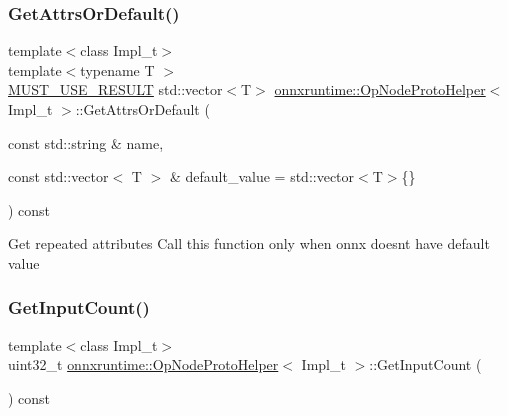 \mbox{\label{classonnxruntime_1_1OpNodeProtoHelper_a16d14c1bba35f141ab9c9921d9190f6c}} 
\subsubsection{\texorpdfstring{Get\+Attrs\+Or\+Default()}{GetAttrsOrDefault()}}
{\footnotesize\ttfamily template$<$class Impl\+\_\+t$>$ \\
template$<$typename T $>$ \\
\mbox{\hyperlink{op__node__proto__helper_8h_afefbce768b9d0df9c9ebc30dd6d13fed}{M\+U\+S\+T\+\_\+\+U\+S\+E\+\_\+\+R\+E\+S\+U\+LT}} std\+::vector$<$T$>$ \mbox{\hyperlink{classonnxruntime_1_1OpNodeProtoHelper}{onnxruntime\+::\+Op\+Node\+Proto\+Helper}}$<$ Impl\+\_\+t $>$\+::Get\+Attrs\+Or\+Default (\begin{DoxyParamCaption}\item[{const std\+::string \&}]{name,  }\item[{const std\+::vector$<$ T $>$ \&}]{default\+\_\+value = {\ttfamily std\+:\+:vector$<$T$>$\{\}} }\end{DoxyParamCaption}) const\hspace{0.3cm}{\ttfamily [inline]}}

Get repeated attributes Call this function only when onnx doesn\textquotesingle{}t have default value \mbox{\label{classonnxruntime_1_1OpNodeProtoHelper_a297703ea309efda9c6803fd49ce0cc6f}} 
\subsubsection{\texorpdfstring{Get\+Input\+Count()}{GetInputCount()}}
{\footnotesize\ttfamily template$<$class Impl\+\_\+t$>$ \\
uint32\+\_\+t \mbox{\hyperlink{classonnxruntime_1_1OpNodeProtoHelper}{onnxruntime\+::\+Op\+Node\+Proto\+Helper}}$<$ Impl\+\_\+t $>$\+::Get\+Input\+Count (\begin{DoxyParamCaption}{ }\end{DoxyParamCaption}) const\hspace{0.3cm}{\ttfamily [inline]}}

